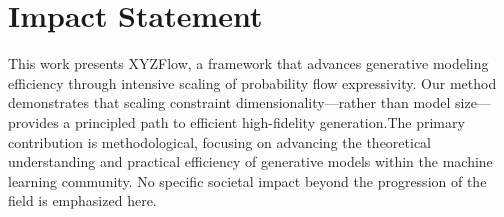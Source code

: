 \documentclass{article}
\theoremstyle{plain}
\theoremstyle{definition}
\theoremstyle{remark}
\begin{document}





\newpage
\nocite{langley00}
\section*{Impact Statement}

\label{sec:Impact Statement}

\vspace{-2mm}

This work presents XYZFlow, a framework that advances generative modeling efficiency through intensive scaling of probability flow expressivity. Our method demonstrates that scaling constraint dimensionality—rather than model size—provides a principled path to efficient high-fidelity generation.The primary contribution is methodological, focusing on advancing the theoretical understanding and practical efficiency of generative models within the machine learning community. No specific societal impact beyond the progression of the field is emphasized here.


\end{document}
